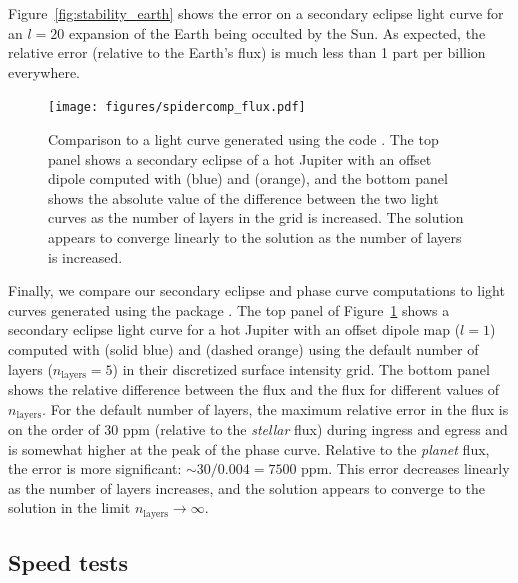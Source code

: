 \documentclass[modern]{aastex61}
\begin{document}
Figure~\ref{fig:stability_earth} shows the error on a secondary eclipse
light curve for an $l = 20$ expansion of the Earth being occulted by the Sun.
As expected, the relative error (relative to the Earth's flux) is much less than 1 part
per billion everywhere.

\begin{figure}[t!]
    \begin{centering}
    \texttt{[image: figures/spidercomp\_flux.pdf]}
    \caption{\label{fig:spidercomp_flux}
             Comparison to a light curve generated using the \spiderman code
             \citep{Louden2018}. The top panel shows a secondary eclipse of a
             hot Jupiter with an offset dipole computed with \starry (blue)
             and \spiderman (orange), and the bottom panel shows the absolute
             value of the difference between the two light curves as the number
             of layers in the \spiderman grid is increased. The \spiderman solution
             appears to converge linearly to the \starry solution as the number of layers
             is increased.
             }
    \end{centering}
\end{figure}

Finally, we compare our secondary eclipse and phase curve computations to
light curves generated using the \spiderman package \citep{Louden2018}.
The top panel of Figure~\ref{fig:spidercomp_flux} shows a secondary eclipse light curve
for a hot Jupiter with an offset dipole map ($l = 1$) computed with
\starry (solid blue) and \spiderman (dashed orange) using the default number
of layers ($n_\mathrm{layers} = 5$) in their discretized surface intensity grid.
The bottom panel shows the relative difference between the \spiderman flux and
the \starry flux for different values of $n_\mathrm{layers}$. For the default
number of layers, the maximum relative error in the \spiderman flux is on the
order of 30 ppm (relative to the \emph{stellar} flux)
during ingress and egress and is somewhat higher at the peak
of the phase curve. Relative to the \emph{planet} flux, the error is more significant: $\sim 30 / 0.004 = 7500$ ppm.
This error decreases linearly as the number of layers increases, and the \spiderman solution
appears to converge to the \starry solution in the limit $n_\mathrm{layers} \rightarrow \infty$.

\subsection{Speed tests}
\label{sec:starryspeed}
\end{document}
